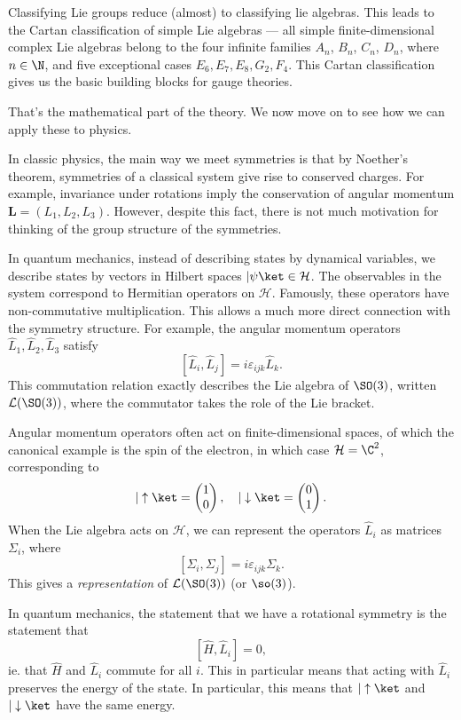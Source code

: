 \documentclass[a4paper]{article}
\begin{document}
Classifying Lie groups reduce (almost) to classifying lie algebras. This leads to the Cartan classification of simple Lie algebras --- all simple finite-dimensional complex Lie algebras belong to the four infinite families $A_n$, $B_n$, $C_n$, $D_n$, where $n \in \N$, and five exceptional cases $E_6, E_7, E_8, G_2, F_4$. This Cartan classification gives us the basic building blocks for gauge theories.

That's the mathematical part of the theory. We now move on to see how we can apply these to physics.

In classic physics, the main way we meet symmetries is that by Noether's theorem, symmetries of a classical system give rise to conserved charges. For example, invariance under rotations imply the conservation of angular momentum $\mathbf{L} = (L_1, L_2, L_3)$. However, despite this fact, there is not much motivation for thinking of the group structure of the symmetries.

In quantum mechanics, instead of describing states by dynamical variables, we describe states by vectors in Hilbert spaces $|\psi\ket \in \mathcal{H}$. The observables in the system correspond to Hermitian operators on $\mathcal{H}$. Famously, these operators have non-commutative multiplication. This allows a much more direct connection with the symmetry structure. For example, the angular momentum operators $\hat{L}_1, \hat{L}_2, \hat{L}_3$ satisfy
\[
  [\hat{L}_i, \hat{L}_j] = i \varepsilon_{ijk} \hat{L}_k.
\]
This commutation relation exactly describes the Lie algebra of $\SO(3)$, written $\mathcal{L}(\SO(3))$, where the commutator takes the role of the Lie bracket.

Angular momentum operators often act on finite-dimensional spaces, of which the canonical example is the spin of the electron, in which case $\mathcal{H} = \C^2$, corresponding to
\[
  |\uparrow\ket =
  \begin{pmatrix}
    1\\0
  \end{pmatrix}
  ,\quad |\downarrow\ket =
  \begin{pmatrix}
    0\\1
  \end{pmatrix}.
\]
When the Lie algebra acts on $\mathcal{H}$, we can represent the operators $\hat{L}_i$ as matrices $\Sigma_i$, where
\[
  [\Sigma_i, \Sigma_j] = i \varepsilon_{ijk} \Sigma_k.
\]
This gives a \emph{representation} of $\mathcal{L}(\SO(3))$ (or $\so(3)$).

In quantum mechanics, the statement that we have a rotational symmetry is the statement that
\[
  [\hat{H}, \hat{L}_i] = 0,
\]
ie. that $\hat{H}$ and $\hat{L}_i$ commute for all $i$. This in particular means that acting with $\hat{L}_i$ preserves the energy of the state. In particular, this means that $|\uparrow\ket$ and $|\downarrow\ket$ have the same energy.
\end{document}
